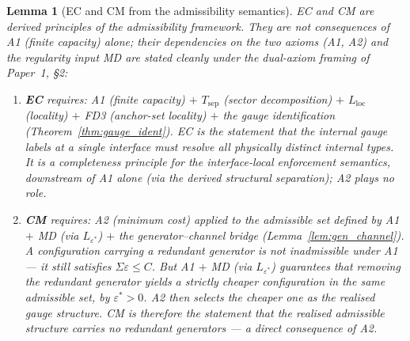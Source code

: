 \documentclass[11pt,a4paper]{article}
\newtheorem{lemma}[theorem]{Lemma}
\theoremstyle{definition}
\begin{document}
\begin{lemma}[EC and CM from the admissibility semantics]\label{lem:EC_CM_from_A1}
EC and CM are derived principles of the admissibility framework.
They are not consequences of A1 (finite capacity) alone; their
dependencies on the two axioms (A1, A2) and the regularity input MD
are stated cleanly under the dual-axiom framing of Paper~1, \S2:
\begin{enumerate}[label=(\roman*),nosep]
  \item \textbf{EC} requires: A1 (finite capacity) $+$
  $T_{\mathrm{sep}}$ (sector decomposition) $+$
  $L_{\mathrm{loc}}$ (locality) $+$ FD3 (anchor-set locality) $+$
  the gauge identification (Theorem~\ref{thm:gauge_ident}).
  EC is the statement that the internal gauge labels at a single
  interface must resolve all physically distinct internal types.
  It is a \emph{completeness principle for the interface-local
  enforcement semantics}, downstream of A1 alone (via the derived
  structural separation); A2 plays no role.
  \item \textbf{CM} requires: A2 (minimum cost) applied to the
  admissible set defined by A1 $+$ MD (via $L_{\varepsilon^*}$) $+$
  the generator--channel bridge (Lemma~\ref{lem:gen_channel}).
  A configuration carrying a redundant generator is \emph{not}
  inadmissible under A1 --- it still satisfies $\Sigma\varepsilon \le C$.
  But A1 $+$ MD (via $L_{\varepsilon^*}$) guarantees that removing the
  redundant generator yields a strictly cheaper configuration in the
  same admissible set, by $\varepsilon^* > 0$.  A2 then selects the
  cheaper one as the realised gauge structure.  CM is therefore the
  statement that the realised admissible structure carries no
  redundant generators --- a direct consequence of A2.
\end{enumerate}
\end{lemma}
\end{document}
